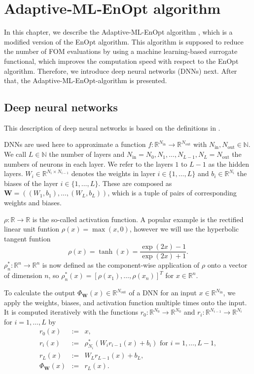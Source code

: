 \chapter{\label{ChapterAdaptiveMLEnOptAlgorithm}Adaptive‑ML‑EnOpt algorithm}

In this chapter, we describe the Adaptive-ML-EnOpt algorithm \cite{Keil2022-dj}, which is a modified version of the EnOpt algorithm. This algorithm is supposed to reduce the number of FOM evaluations by using a machine learning-based surrogate functional, which improves the computation speed with respect to the EnOpt algorithm. Therefore, we introduce deep neural networks (DNNs) next. After that, the Adaptive-ML-EnOpt-algorithm is presented.

\section{\label{sectionDeepNeuralNetworks}Deep neural networks}

This description of deep neural networks is based on the definitions in \cite{Keil2022-dj}.

DNNs are used here to approximate a function $f:\mathbb{R}^{N_{\mathrm{in}}}\to\mathbb{R}^{N_{\mathrm{out}}}$ with $N_{\mathrm{in}},N_{\mathrm{out}}\in\mathbb{N}$. We call $L\in\mathbb{N}$ the number of layers and $N_{\mathrm{in}}=N_0,N_1,\dotsc,N_{L-1}, N_L=N_{\mathrm{out}}$ the numbers of neurons in each layer. We refer to the layers $1$ to $L-1$ as the hidden layers. $W_i\in\mathbb{R}^{N_i\times N_{i-1}}$ denotes the weights in layer $i\in\{1,\dotsc,L\}$ and $b_i\in\mathbb{R}^{N_i}$ the biases of the layer $i\in\{1,\dotsc,L\}$. These are composed as $\mathbf{W}=\left((W_1,b_1),\dotsc,(W_L,b_L)\right)$, which is a tuple of pairs of corresponding weights and biases.

$\rho:\mathbb{R}\to\mathbb{R}$ is the so-called activation function. A popular example is the rectified linear unit funtion $\rho(x)=\operatorname{max}(x,0)$, however we will use the hyperbolic tangent funtion
\begin{displaymath}
\rho(x)=\tanh(x)=\frac{\exp(2x)-1}{\exp(2x)+1}.
\end{displaymath}
$\rho_n^*:\mathbb{R}^n\to\mathbb{R}^n$ is now defined as the component-wise application of $\rho$ onto a vector of dimension $n$, so $\rho_n^*(x)=\left[\rho(x_1),\dotsc,\rho(x_n)\right]^T$ for $x\in\mathbb{R}^n$.

To calculate the output $\Phi_\mathbf{W}(x)\in\mathbb{R}^{N_{\mathrm{out}}}$ of a DNN for an input $x\in\mathbb{R}^{N_{\mathrm{in}}}$, we apply the weights, biases, and activation function multiple times onto the input. It is computed iteratively with the functions $r_0:\mathbb{R}^{N_0}\to\mathbb{R}^{N_0}$ and $r_i:\mathbb{R}^{N_{i-1}}\to\mathbb{R}^{N_i}$ for $i=1,\dotsc,L$ by
\begin{eqnarray*}
r_0(x)&:=&x,\\
r_i(x)&:=&\rho_{N_i}^*(W_ir_{i-1}(x)+b_i)\text{ for }i=1,\dotsc,L-1,\\
r_L(x)&:=&W_Lr_{L-1}(x)+b_L,\\
\Phi_\mathbf{W}(x)&:=&r_L(x).
\end{eqnarray*}

